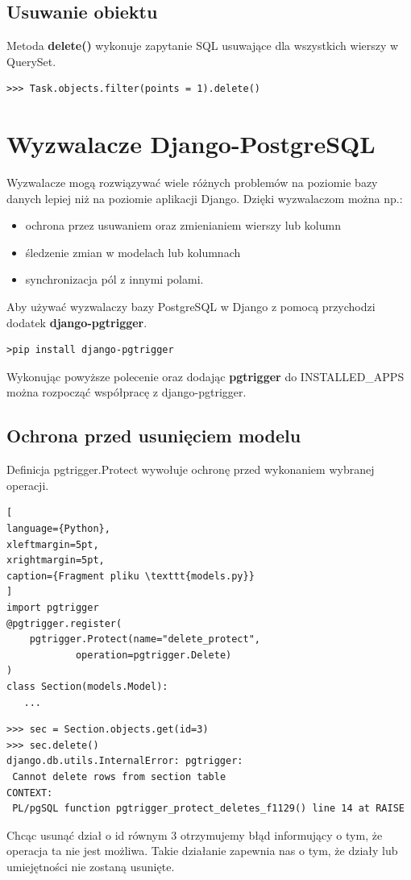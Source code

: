 \documentclass[oneside,polski,logo,indent]{amuthesis}
\begin{document}
\begin{enumerate}
\begin{enumerate}
\subsection{Usuwanie obiektu}
Metoda \textbf{delete()} wykonuje zapytanie SQL usuwające dla wszystkich wierszy w QuerySet.
\begin{lstlisting}[style=DOS]
>>> Task.objects.filter(points = 1).delete()
\end{lstlisting}
\section{Wyzwalacze Django-PostgreSQL}
Wyzwalacze mogą rozwiązywać wiele różnych problemów na poziomie bazy danych lepiej niż na poziomie aplikacji Django. Dzięki wyzwalaczom można np.:
\begin{itemize}
\item ochrona przez usuwaniem oraz zmienianiem wierszy lub kolumn
\item śledzenie zmian w modelach lub kolumnach
\item synchronizacja pól z innymi polami.
\end{itemize}
Aby używać wyzwalaczy bazy PostgreSQL w Django z pomocą przychodzi dodatek \textbf{django-pgtrigger}.
\begin{lstlisting}[style=DOS]
>pip install django-pgtrigger
\end{lstlisting}
Wykonując powyższe polecenie oraz dodając \textbf{pgtrigger} do INSTALLED\_APPS można rozpocząć współpracę z django-pgtrigger.
\subsection{Ochrona przed usunięciem modelu}
Definicja pgtrigger.Protect wywołuje ochronę przed wykonaniem wybranej operacji.
\begin{lstlisting}[
language={Python},
xleftmargin=5pt,
xrightmargin=5pt,
caption={Fragment pliku \texttt{models.py}}
]
import pgtrigger
@pgtrigger.register(
	pgtrigger.Protect(name="delete_protect",
			operation=pgtrigger.Delete)
)
class Section(models.Model):
   ...
\end{lstlisting}
\begin{lstlisting}[style=DOS]
>>> sec = Section.objects.get(id=3)
>>> sec.delete()
django.db.utils.InternalError: pgtrigger: 
 Cannot delete rows from section table
CONTEXT:  
 PL/pgSQL function pgtrigger_protect_deletes_f1129() line 14 at RAISE
\end{lstlisting}
Chcąc usunąć dział o id równym 3 otrzymujemy błąd informujący o tym, że operacja ta nie jest możliwa. Takie działanie zapewnia nas o tym, że działy lub umiejętności nie zostaną usunięte.

\end{enumerate}
\end{enumerate}
\end{document}
